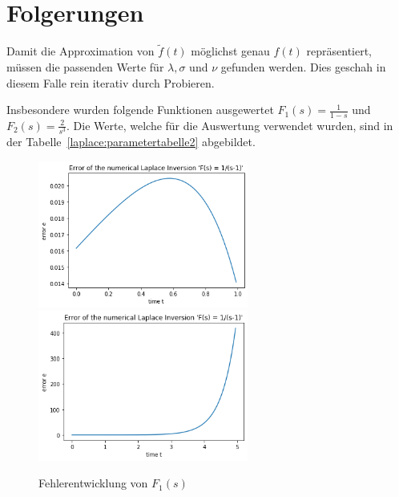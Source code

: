 %
%

\section{Folgerungen
\label{laplace:section:folgerungen}}
Damit die Approximation von $\tilde{f}(t)$ möglichst genau $f(t)$ repräsentiert,
müssen die passenden Werte für $\lambda, \sigma $ und $\nu $ gefunden werden. 
Dies geschah in diesem Falle rein iterativ durch Probieren.

Insbesondere wurden folgende Funktionen ausgewertet $ F_{1}(s)=\frac{1}{1-s} $ und $F_{2}(s) = \frac{2}{s^{3}}$. 
Die Werte, welche für die Auswertung verwendet wurden, sind in der Tabelle~\ref{laplace:parametertabelle2} abgebildet.


\begin{figure}
\centering
\includegraphics[width=6.9cm]{papers/laplace/Error_1divide_sminus1}
\includegraphics[width=6.9cm]{papers/laplace/Error_1divide_sminus1_bis_tgleich5}
\caption{Fehlerentwicklung von $F_{1}(s)$
\label{laplace:fehlerf1}
}
\end{figure}

